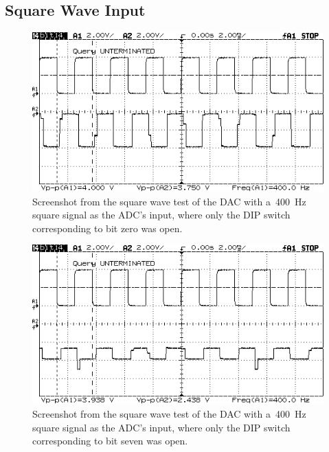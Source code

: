 \subsection{Square Wave Input}
\begin{figure}[H]
	\centering
	\includegraphics[width=.6\textwidth]{img/shot/pt5b_bit0.png}
	\parbox{.6\textwidth}{
	\caption[\SI{400}{\hertz} Square Wave --- Bit 0 Open]{Screenshot from the square wave test of the DAC with a~\SI{400}{\hertz} square signal as the ADC's input, where only the DIP switch corresponding to bit zero was open.}
	\label{fig:pt5b_bit0}}
\end{figure}

\begin{figure}[H]
	\centering
	\includegraphics[width=.6\textwidth]{img/shot/pt5b_bit7.png}
	\parbox{.6\textwidth}{
	\caption[\SI{400}{\hertz} Square Wave --- Bit 7 Open]{Screenshot from the square wave test of the DAC with a~\SI{400}{\hertz} square signal as the ADC's input, where only the DIP switch corresponding to bit seven was open.}
	\label{fig:pt5b_bit7}}
\end{figure}
